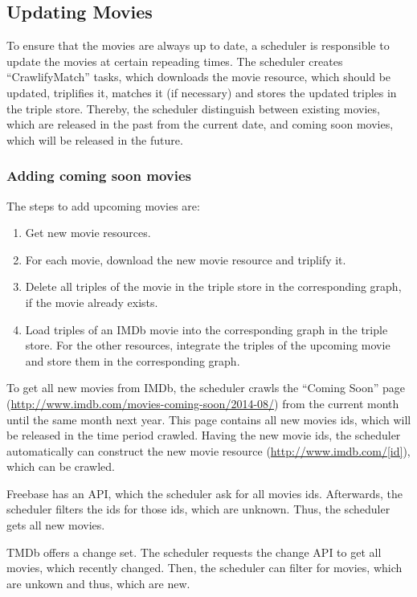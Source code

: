 \subsection{Updating Movies}
\label{subsec_method_updating}

To ensure that the movies are always up to date, a scheduler is responsible to update the movies at certain repeading times.
The scheduler creates ``CrawlifyMatch'' tasks, which downloads the movie resource, which should be updated, triplifies it, matches it (if necessary) and stores the updated triples in the triple store.
Thereby, the scheduler distinguish between existing movies, which are released in the past from the current date, and coming soon movies, which will be released in the future.

\subsubsection{Adding coming soon movies}
The steps to add upcoming movies are:
\begin {enumerate}
	\item Get new movie resources.
	\item For each movie, download the new movie resource and triplify it.
	\item Delete all triples of the movie in the triple store in the corresponding graph, if the movie already exists.
	\item Load triples of an IMDb movie into the corresponding graph in the triple store. For the other resources, integrate the triples of the upcoming movie and store them in the corresponding graph.
\end{enumerate}

To get all new movies from IMDb, the scheduler crawls the ``Coming Soon'' page (\url{http://www.imdb.com/movies-coming-soon/2014-08/}) from the current month until the same month next year.
This page contains all new movies ids, which will be released in the time period crawled.
Having the new movie ids, the scheduler automatically can construct the new movie resource (\url{http://www.imdb.com/[id]}), which can be crawled.

Freebase has an API, which the scheduler ask for all movies ids.
Afterwards, the scheduler filters the ids for those ids, which are unknown.
Thus, the scheduler gets all new movies.

TMDb offers a change set.
The scheduler requests the change API to get all movies, which recently changed.
Then, the scheduler can filter for movies, which are unkown and thus, which are new.

